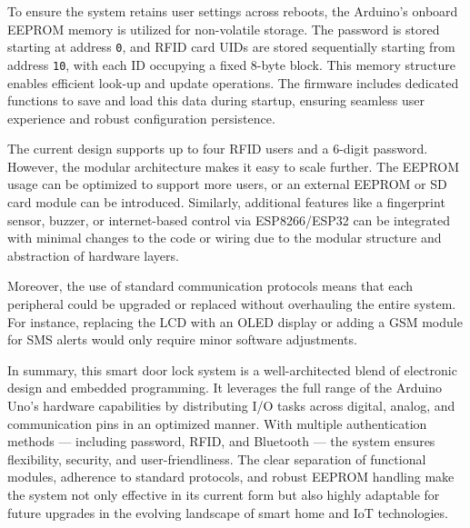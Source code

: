 \documentclass[conference, onecolumn]{IEEEtran}
\begin{document}
To ensure the system retains user settings across reboots, the Arduino’s onboard EEPROM memory is utilized for non-volatile storage. The password is stored starting at address \texttt{0}, and RFID card UIDs are stored sequentially starting from address \texttt{10}, with each ID occupying a fixed 8-byte block. This memory structure enables efficient look-up and update operations. The firmware includes dedicated functions to save and load this data during startup, ensuring seamless user experience and robust configuration persistence.

The current design supports up to four RFID users and a 6-digit password. However, the modular architecture makes it easy to scale further. The EEPROM usage can be optimized to support more users, or an external EEPROM or SD card module can be introduced. Similarly, additional features like a fingerprint sensor, buzzer, or internet-based control via ESP8266/ESP32 can be integrated with minimal changes to the code or wiring due to the modular structure and abstraction of hardware layers.

Moreover, the use of standard communication protocols means that each peripheral could be upgraded or replaced without overhauling the entire system. For instance, replacing the LCD with an OLED display or adding a GSM module for SMS alerts would only require minor software adjustments.

In summary, this smart door lock system is a well-architected blend of electronic design and embedded programming. It leverages the full range of the Arduino Uno’s hardware capabilities by distributing I/O tasks across digital, analog, and communication pins in an optimized manner. With multiple authentication methods — including password, RFID, and Bluetooth — the system ensures flexibility, security, and user-friendliness. The clear separation of functional modules, adherence to standard protocols, and robust EEPROM handling make the system not only effective in its current form but also highly adaptable for future upgrades in the evolving landscape of smart home and IoT technologies.
\end{document}
